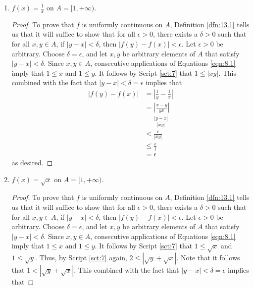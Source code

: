 \documentclass[../main.tex]{subfiles}
\begin{document}
\begin{exercise}
\begin{enumerate}[label={(\alph*)}]
        \begin{proof}
            To prove that $f$ is not uniformly continuous on $A$, Definition \ref{dfn:13.1} tells us that it will suffice to find an $\epsilon>0$ for which no $\delta>0$ exists such that for all $x,y\in A$, if $|y-x|<\delta$, then $|\frac{1}{y}-\frac{1}{x}|<\epsilon$. Let $\epsilon=1$, and suppose for the sake of contradiction that $\delta>0$ is a number such that for all $x,y\in A$, if $|y-x|<\delta$, then $|\frac{1}{y}-\frac{1}{x}|<1$. As in part (a), choose $0<x<\min(\delta,\frac{1}{2})$. Consequently, $|(x+x)-x|<\delta$. It follows by the above that $|\frac{1}{2x}-\frac{1}{x}|<1$. But this implies that $|\frac{x-2x}{2x^2}|=|\frac{-1}{2x}|=\frac{1}{2x}<1$. However, $x<\frac{1}{2}$ implies that $1<\frac{1}{2x}$, a contradiction.
        \end{proof}
        \item $f(x)=\frac{1}{x}$ on $A=[1,+\infty)$.
        \begin{proof}
            To prove that $f$ is uniformly continuous on $A$, Definition \ref{dfn:13.1} tells us that it will suffice to show that for all $\epsilon>0$, there exists a $\delta>0$ such that for all $x,y\in A$, if $|y-x|<\delta$, then $|f(y)-f(x)|<\epsilon$. Let $\epsilon>0$ be arbitrary. Choose $\delta=\epsilon$, and let $x,y$ be arbitrary elements of $A$ that satisfy $|y-x|<\delta$. Since $x,y\in A$, consecutive applications of Equations \ref{eqn:8.1} imply that $1\leq x$ and $1\leq y$. It follows by Script \ref{sct:7} that $1\leq|xy|$. This combined with the fact that $|y-x|<\delta=\epsilon$ implies that
            \begin{align*}
                |f(y)-f(x)| &= \left| \frac{1}{y}-\frac{1}{x} \right|\\
                &= \left| \frac{x-y}{yx} \right|\\
                &= \frac{|y-x|}{|xy|}\\
                &< \frac{\epsilon}{|xy|}\\
                &\leq \frac{\epsilon}{1}\\
                &= \epsilon
            \end{align*}
            as desired.
        \end{proof}
        \item $f(x)=\sqrt{x}$ on $A=[1,+\infty)$.
        \begin{proof}
            To prove that $f$ is uniformly continuous on $A$, Definition \ref{dfn:13.1} tells us that it will suffice to show that for all $\epsilon>0$, there exists a $\delta>0$ such that for all $x,y\in A$, if $|y-x|<\delta$, then $|f(y)-f(x)|<\epsilon$. Let $\epsilon>0$ be arbitrary. Choose $\delta=\epsilon$, and let $x,y$ be arbitrary elements of $A$ that satisfy $|y-x|<\delta$. Since $x,y\in A$, consecutive applications of Equations \ref{eqn:8.1} imply that $1\leq x$ and $1\leq y$. It follows by Script \ref{sct:7} that $1\leq\sqrt{x}$ and $1\leq\sqrt{y}$. Thus, by Script \ref{sct:7} again, $2\leq|\sqrt{y}+\sqrt{x}|$. Note that it follows that $1<|\sqrt{y}+\sqrt{x}|$. This combined with the fact that $|y-x|<\delta=\epsilon$ implies that

\end{proof}
\end{enumerate}
\end{exercise}
\end{document}
